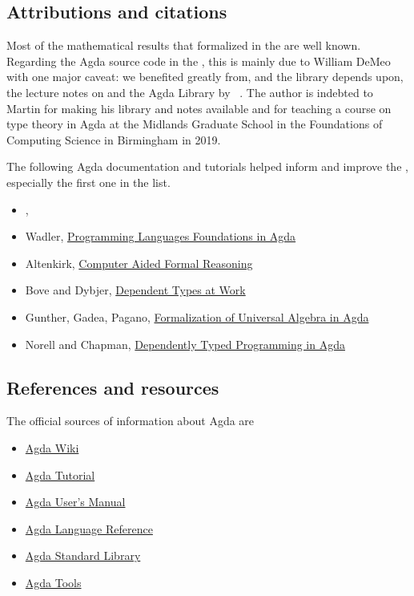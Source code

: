 \subsection*{Attributions and citations}

Most of the mathematical results that formalized in the \ualib are well known. Regarding the Agda source code in the \agdaualib, this is mainly due to William DeMeo with one major caveat: we benefited greatly from, and the library depends upon, the lecture notes on \ufcourse and the \typetopology Agda Library by \escardo~\cite{MHE}. The author is indebted to Martin for making his library and notes available and for teaching a course on type theory in Agda at the Midlands Graduate School in the Foundations of Computing Science in Birmingham in 2019.

The following Agda documentation and tutorials helped inform and improve the \ualib, especially the first one in the list.

\begin{itemize}
\item \escardo, \ufcourse
\item Wadler, \href{https://plfa.github.io/}{Programming Languages Foundations in Agda}
\item Altenkirk, \href{http://www.cs.nott.ac.uk/~psztxa/g53cfr/}{Computer Aided Formal Reasoning}
\item Bove and Dybjer, \href{http://www.cse.chalmers.se/~peterd/papers/DependentTypesAtWork.pdf}{Dependent Types at Work}
\item Gunther, Gadea, Pagano, \href{http://www.sciencedirect.com/science/article/pii/S1571066118300768}{Formalization of Universal Algebra in Agda}
\item Norell and Chapman, \href{http://www.cse.chalmers.se/~ulfn/papers/afp08/tutorial.pdf}{Dependently Typed Programming in Agda}
\end{itemize}


\subsection*{References and resources}

The official sources of information about Agda are
\begin{itemize}
\item \href{https://wiki.portal.chalmers.se/agda/pmwiki.php}{Agda Wiki}
\item \href{https://people.inf.elte.hu/pgj/agda/tutorial/Index.html}{Agda Tutorial}
\item \href{https://agda.readthedocs.io/en/v2.6.1/}{Agda User's Manual}
\item \href{https://agda.readthedocs.io/en/v2.6.1/language}{Agda Language Reference}
\item \href{https://agda.github.io/agda-stdlib/}{Agda Standard Library}
\item \href{https://agda.readthedocs.io/en/v2.6.1/tools/}{Agda Tools}
\end{itemize}



